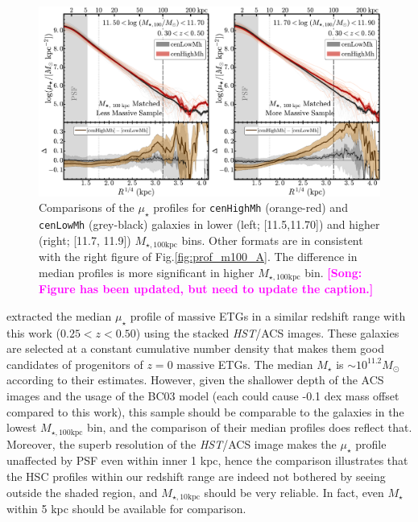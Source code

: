 \documentclass{emulateapj}
\def\rbcg{\texttt{cenHighMh}}
\def\nbcg{\texttt{cenLowMh}}
\def\mstar{{$M_{\star}$}}
\def\minn{{$M_{\star,10\mathrm{kpc}}$}}
\def\mtot{{$M_{\star,100\mathrm{kpc}}$}}
\def\mden{{$\mu_{\star}$}}
\newcommand{\song}[1]{\textcolor{magenta}{\textbf{[Song: #1]}}}
\begin{document}
\begin{CJK*}{UTF8}{gbsn}
  \begin{figure}[t]
      \centering 
      \includegraphics[width=\textwidth]{fig/redbcg_prof_2}
      \caption{Comparisons of the \mden{} profiles for \rbcg{} (orange-red) and \nbcg{} 
      	(grey-black) galaxies in lower (left; [11.5,11.70]) and higher 
        (right; [11.7, 11.9]) \mtot{} bins. 
        Other formats are in consistent with the right figure of 
        Fig.\ref{fig:prof_m100_A}.
        The difference in median profiles is more significant in higher \mtot{} bin.
        \song{Figure has been updated, but need to update the caption.}
        }
      \label{fig:prof_m100_C}
  \end{figure}

    \citet{Patel2013} extracted the median \mden{} profile of massive ETGs in a similar 
    redshift range with this work ($0.25 < z < 0.50$) using the stacked \textit{HST}/ACS
    images. 
    These galaxies are selected at a constant cumulative number density that makes them  
    good candidates of progenitors of $z=0$ massive ETGs.  
    The median \mstar{} is $\sim 10^{11.2} M_{\odot}$ according to their estimates.  
    However, given the shallower depth of the ACS images and the usage of the BC03 model 
    (each could cause -0.1 dex mass offset compared to this work), this sample should be 
    comparable to the galaxies in the lowest \mtot{} bin, and the comparison of their 
    median profiles does reflect that.  
    Moreover, the superb resolution of the \textit{HST}/ACS image makes the \mden{} 
    profile unaffected by PSF even within inner 1 kpc, hence the comparison illustrates 
    that the HSC profiles within our redshift range are indeed not bothered by 
    seeing outside the shaded region, and \minn{} should be very reliable.
    In fact, even \mstar{} within 5 kpc should be available for comparison.  
  

\end{CJK*}
\end{document}
